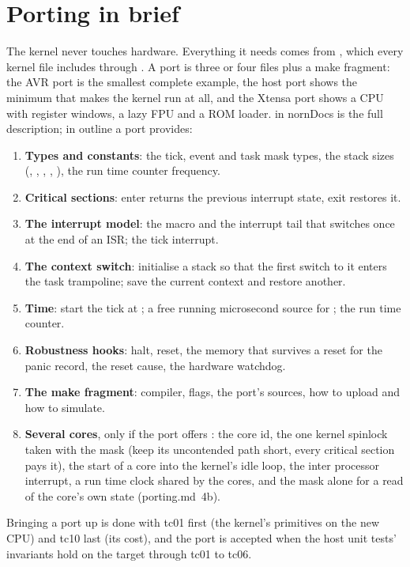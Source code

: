 \chapter{Porting in brief}
\label{app:porting}

The kernel never touches hardware. Everything it needs comes from
, which every kernel file includes through . A
port is three or four files plus a make fragment: the AVR port is the smallest complete
example, the host port shows the minimum that makes the kernel run at all, and the
Xtensa port shows a CPU with register windows, a lazy FPU and a ROM loader.
 in nornDocs is the full description; in outline a port provides:

\begin{enumerate}
\item \textbf{Types and constants}: the tick, event and task mask types, the stack
  sizes (, , , ,
  ), the run time counter frequency.
\item \textbf{Critical sections}: enter returns the previous interrupt state, exit
  restores it.
\item \textbf{The interrupt model}: the  macro and the interrupt tail
  that switches once at the end of an ISR; the tick interrupt.
\item \textbf{The context switch}: initialise a stack so that the first switch to it
  enters the task trampoline; save the current context and restore another.
\item \textbf{Time}: start the tick at ; a free running
  microsecond source for ; the run time counter.
\item \textbf{Robustness hooks}: halt, reset, the memory that survives a reset for the
  panic record, the reset cause, the hardware watchdog.
\item \textbf{The make fragment}: compiler, flags, the port's sources, how to upload and
  how to simulate.
\item \textbf{Several cores}, only if the port offers : the core
  id, the one kernel spinlock taken with the mask (keep its uncontended path short, every
  critical section pays it), the start of a core into the kernel's idle loop, the inter
  processor interrupt, a run time clock shared by the cores, and the mask alone for a
  read of the core's own state (porting.md~4b).
\end{enumerate}

Bringing a port up is done with tc01 first (the kernel's primitives on the new CPU) and
tc10 last (its cost), and the port is accepted when the host unit tests' invariants hold
on the target through tc01 to tc06.
